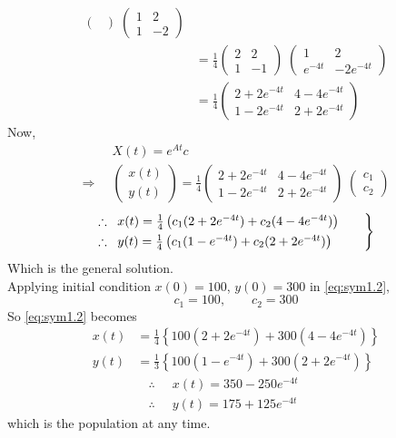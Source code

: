 \documentclass[../main-sheet.tex]{subfiles}
\begin{document}
\begin{soln}
\begin{align*}
\begin{pmatrix}
        \end{pmatrix}\;\begin{pmatrix}
            1 & 2\\
            1 & -2
        \end{pmatrix}\\
        &=\frac{1}{4}\begin{pmatrix}
            2 & 2\\
            1 & -1
        \end{pmatrix}\;\begin{pmatrix}
            1 & 2\\
            e^{-4t} & -2e^{-4t}
        \end{pmatrix}\\
        &=\frac{1}{4}\begin{pmatrix}
            2+2e^{-4t} & 4-4e^{-4t}\\
            1-2e^{-4t} & 2+2e^{-4t}
        \end{pmatrix}
    \end{align*}
    Now,
    \begin{align*}
        &X(t)=e^{At}c\\
        \Rightarrow\;\;&\begin{pmatrix}
            x(t)\\
            y(t)
        \end{pmatrix}=\frac{1}{4}\begin{pmatrix}
            2+2e^{-4t} & 4-4e^{-4t}\\
            1-2e^{-4t} & 2+2e^{-4t}
        \end{pmatrix}\;\begin{pmatrix}
            c_1\\
            c_2
        \end{pmatrix}
    \end{align*}
    \begin{equation}
        \begin{rcases}
            \therefore\;\;x(t)=\frac{1}{4}\left( c_1(2+2e^{-4t})+c_2(4-4e^{-4t}) \right)\qquad \\
            \therefore\;\;y(t)=\frac{1}{4}\left( c_1(1-e^{-4t})+c_2(2+2e^{-4t})\right)
        \end{rcases}
        \label{eq:sym1.2}
    \end{equation}
    Which is the general solution.\\
    Applying initial condition \(x(0)=100\), \(y(0)=300\) in \eqref{eq:sym1.2},
    \[c_1=100,\qquad c_2=300\]
    So \eqref{eq:sym1.2} becomes
    \begin{align*}
        x(t)&=\frac{1}{4}\left\{ 100(2+2e^{-4t})+300(4-4e^{-4t}) \right\}\\
        y(t)&=\frac{1}{3}\left\{ 100(1-e^{-4t})+300(2+2e^{-4t}) \right\}
    \end{align*}
        \begin{align*}
            \therefore\;\;&x(t)=350-250e^{-4t}\qquad \\
            \therefore\;\;&y(t)=175+125e^{-4t}
        \end{align*}
    which is the population at any time.
\end{soln}
\end{document}
